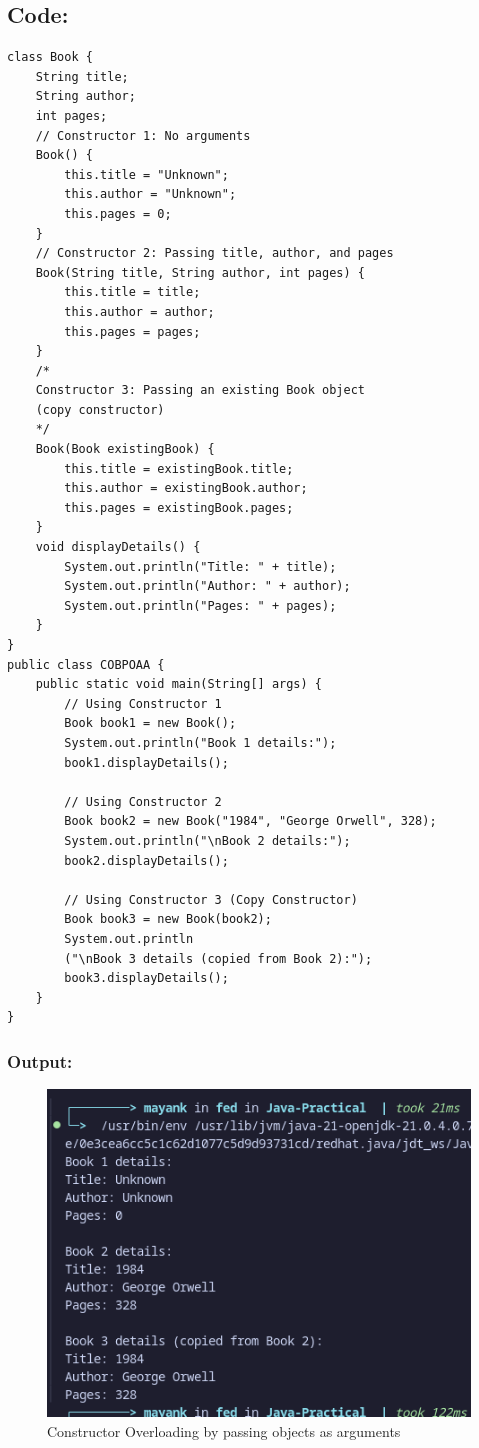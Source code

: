 \documentclass[a4paper,12pt]{article}
\begin{document}
\subsection{Code: }
\begin{lstlisting}
class Book {
    String title;
    String author;
    int pages;
    // Constructor 1: No arguments
    Book() {
        this.title = "Unknown";
        this.author = "Unknown";
        this.pages = 0;
    }
    // Constructor 2: Passing title, author, and pages
    Book(String title, String author, int pages) {
        this.title = title;
        this.author = author;
        this.pages = pages;
    }
    /*
    Constructor 3: Passing an existing Book object
    (copy constructor)
    */
    Book(Book existingBook) {
        this.title = existingBook.title;
        this.author = existingBook.author;
        this.pages = existingBook.pages;
    }
    void displayDetails() {
        System.out.println("Title: " + title);
        System.out.println("Author: " + author);
        System.out.println("Pages: " + pages);
    }
}
public class COBPOAA {
    public static void main(String[] args) {
        // Using Constructor 1
        Book book1 = new Book();
        System.out.println("Book 1 details:");
        book1.displayDetails();

        // Using Constructor 2
        Book book2 = new Book("1984", "George Orwell", 328);
        System.out.println("\nBook 2 details:");
        book2.displayDetails();

        // Using Constructor 3 (Copy Constructor)
        Book book3 = new Book(book2);
        System.out.println
        ("\nBook 3 details (copied from Book 2):");
        book3.displayDetails();
    }
}    
\end{lstlisting}
\subsubsection{Output: }
\begin{figure}[H]
    \centering
    \includegraphics[width=0.9\linewidth]{images/COBPAA.png}
    \caption{Constructor Overloading by passing objects as arguments}
    \label{fig:sample_image}
\end{figure}
\end{document}
